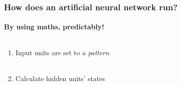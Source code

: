 \documentclass{beamer}
\begin{document}
\begin{frame}
\frametitle{How does an artificial neural network run?}
\framesubtitle{By using maths, predictably!}
  \begin{columns}[T]
    \begin{column}{.5\textwidth}
    \begin{enumerate}
\vfill
\item<1->{Input units are set to a \emph{pattern}} \\ \ \\
\item<3->{Calculate hidden units' states}


\end{enumerate}
\end{column}
\end{columns}
\end{frame}
\end{document}

